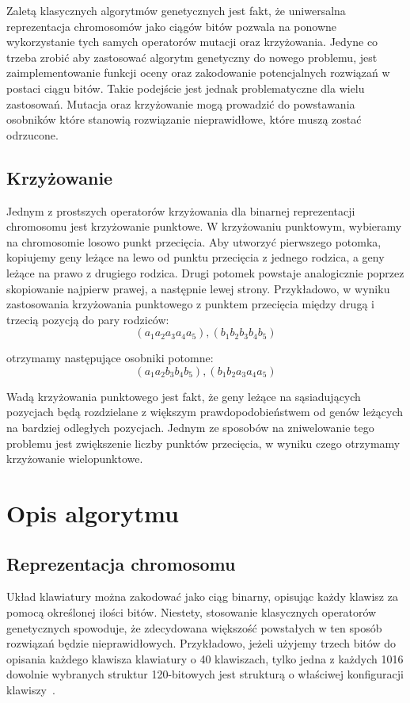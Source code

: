\documentclass[brudnopis]{xmgr}
\begin{document}
Zaletą klasycznych algorytmów genetycznych jest fakt, że uniwersalna reprezentacja chromosomów jako ciągów bitów pozwala na ponowne wykorzystanie tych samych operatorów mutacji oraz krzyżowania. Jedyne co trzeba zrobić aby zastosować algorytm genetyczny do nowego problemu, jest zaimplementowanie funkcji oceny oraz zakodowanie potencjalnych rozwiązań w postaci ciągu bitów. Takie podejście jest jednak problematyczne dla wielu zastosowań. Mutacja oraz krzyżowanie mogą prowadzić do powstawania osobników które stanowią rozwiązanie nieprawidłowe, które muszą zostać odrzucone.

\section{Krzyżowanie}

Jednym z prostszych operatorów krzyżowania dla binarnej reprezentacji chromosomu jest krzyżowanie punktowe. W krzyżowaniu punktowym, wybieramy na chromosomie losowo punkt przecięcia. Aby utworzyć pierwszego potomka, kopiujemy geny leżące na lewo od punktu przecięcia z jednego rodzica, a geny leżące na prawo z drugiego rodzica. Drugi potomek powstaje analogicznie poprzez skopiowanie najpierw prawej, a następnie lewej strony. Przykładowo, w wyniku zastosowania krzyżowania punktowego z punktem przecięcia między drugą i trzecią pozycją do pary rodziców:
$$(a_1 a_2 a_3 a_4 a_5), (b_1 b_2 b_3 b_4 b_5)$$

otrzymamy następujące osobniki potomne:
$$(a_1 a_2 b_3 b_4 b_5), (b_1 b_2 a_3 a_4 a_5)$$

Wadą krzyżowania punktowego jest fakt, że geny leżące na sąsiadujących pozycjach będą rozdzielane z większym prawdopodobieństwem od genów leżących na bardziej odległych pozycjach. Jednym ze sposobów na zniwelowanie tego problemu jest zwiększenie liczby punktów przecięcia, w wyniku czego otrzymamy krzyżowanie wielopunktowe.


\chapter{Opis algorytmu}


\section{Reprezentacja chromosomu}

Układ klawiatury można zakodować jako ciąg binarny, opisując każdy klawisz za pomocą określonej ilości bitów. Niestety, stosowanie klasycznych operatorów genetycznych spowoduje, że zdecydowana większość powstałych w ten sposób rozwiązań będzie nieprawidłowych. Przykładowo, jeżeli użyjemy trzech bitów do opisania każdego klawisza klawiatury o 40 klawiszach, tylko jedna z każdych 1016 dowolnie wybranych struktur 120-bitowych jest strukturą o właściwej konfiguracji klawiszy~\cite{GloverKey}.
\end{document}
